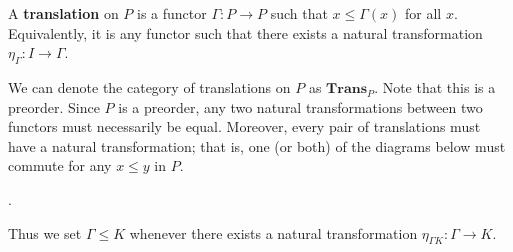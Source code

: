 \begin{definition}
    A \textbf{translation} on $P$ is a functor $\Gamma: P \to P$ such that 
    $x \le \Gamma(x)$ for all $x$. Equivalently, it is any functor such that there 
    exists a natural transformation $\eta_\Gamma: I \to \Gamma$. 
\end{definition}

We can denote the category of translations on $P$ as $\textbf{Trans}_P$. 
Note that this is a preorder. Since $P$ is a preorder,
any two natural transformations between two functors must necessarily be equal. 
Moreover, every pair of translations must have a natural transformation; that is, 
one (or both) of the diagrams below must commute for any $x \le y$  in $P$. 
\begin{center}
    \hspace{1cm}
    .
\end{center}
Thus we set $\Gamma \le K$ whenever there exists a natural transformation 
$\eta_{\Gamma K}: \Gamma \to K$. 

